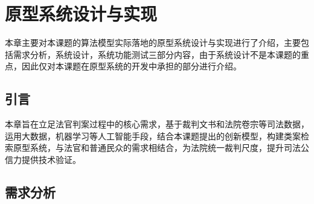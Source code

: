 
\chapter{原型系统设计与实现}
本章主要对本课题的算法模型实际落地的原型系统设计与实现进行了介绍，主要包括需求分析，系统设计，系统功能测试三部分内容，由于系统设计不是本课题的重点，因此仅对本课题在原型系统的开发中承担的部分进行介绍。

\section{引言}
\label{sec:sys_intro}
本章旨在立足法官判案过程中的核心需求，基于裁判文书和法院卷宗等司法数据，运用大数据，机器学习等人工智能手段，结合本课题提出的创新模型，构建类案检索原型系统，与法官和普通民众的需求相结合，为法院统一裁判尺度，提升司法公信力提供技术验证。

\section{需求分析}


